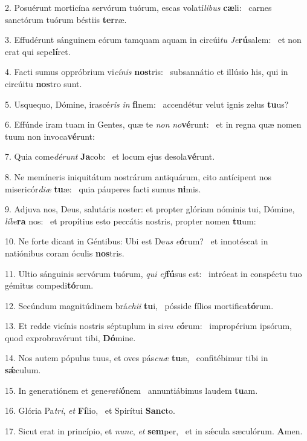 2. Posuérunt morticína servórum tuórum, escas volatí\textit{li}\textit{bus} \textbf{cæ}li: \ast\  carnes sanctórum tuórum béstiis \textbf{ter}ræ.\

3. Effudérunt sánguinem eórum tamquam aquam in circúi\textit{tu} \textit{Je}\textbf{rú}salem: \ast\  et non erat qui sepe\textbf{lí}ret.\

4. Facti sumus oppróbrium vi\textit{cí}\textit{nis} \textbf{nos}tris: \ast\  subsannátio et illúsio his, qui in circúitu \textbf{nos}tro sunt.\

5. Usquequo, Dómine, irascé\textit{ris} \textit{in} \textbf{fi}nem: \ast\  accendétur velut ignis zelus \textbf{tu}us?\

6. Effúnde iram tuam in Gentes, quæ te \textit{non} \textit{no}\textbf{vé}runt: \ast\  et in regna quæ nomen tuum non invoca\textbf{vé}runt:\

7. Quia come\textit{dé}\textit{runt} \textbf{Ja}cob: \ast\  et locum ejus desola\textbf{vé}runt.\

8. Ne memíneris iniquitátum nostrárum antiquárum, cito antícipent nos misericór\textit{di}\textit{æ} \textbf{tu}æ: \ast\  quia páuperes facti sumus \textbf{ni}mis.\

9. Adjuva nos, Deus, salutáris noster: et propter glóriam nóminis tui, Dómine, \textit{lí}\textit{be}\textbf{ra} nos: \ast\  et propítius esto peccátis nostris, propter nomen \textbf{tu}um:\

10. Ne forte dicant in Géntibus: Ubi est De\textit{us} \textit{e}\textbf{ó}rum? \ast\  et innotéscat in natiónibus coram óculis \textbf{nos}tris.\

11. Ultio sánguinis servórum tuórum, \textit{qui} \textit{ef}\textbf{fú}sus est: \ast\  intróeat in conspéctu tuo gémitus compedi\textbf{tó}rum.\

12. Secúndum magnitúdinem brá\textit{chi}\textit{i} \textbf{tu}i, \ast\  pósside fílios mortifica\textbf{tó}rum.\

13. Et redde vicínis nostris séptuplum in si\textit{nu} \textit{e}\textbf{ó}rum: \ast\  impropérium ipsórum, quod exprobravérunt tibi, \textbf{Dó}mine.\

14. Nos autem pópulus tuus, et oves pás\textit{cu}\textit{æ} \textbf{tu}æ, \ast\  confitébimur tibi in \textbf{sǽ}culum.\

15. In generatiónem et gene\textit{ra}\textit{ti}\textbf{ó}nem \ast\  annuntiábimus laudem \textbf{tu}am.\

16. Glória Pa\textit{tri}, \textit{et} \textbf{Fí}lio, \ast\  et Spirítui \textbf{Sanc}to.\

17. Sicut erat in princípio, et \textit{nunc}, \textit{et} \textbf{sem}per, \ast\  et in sǽcula sæculórum. \textbf{A}men.\

